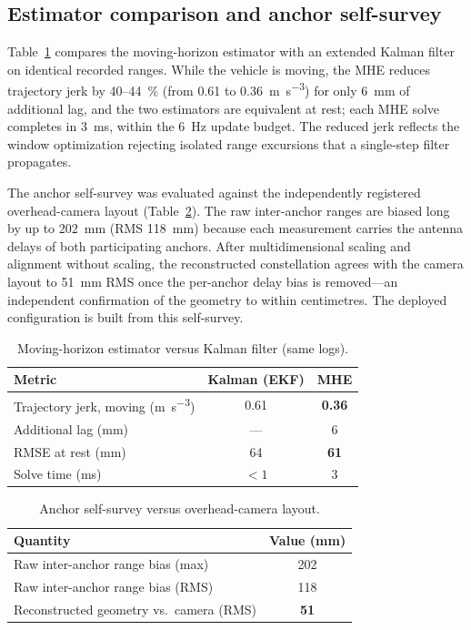 \subsection{Estimator comparison and anchor self-survey}
Table~\ref{tab:est} compares the moving-horizon estimator with an
extended Kalman filter on identical recorded ranges. While the vehicle is
moving, the MHE reduces trajectory jerk by \SI{40}{}--\SI{44}{\percent}
(from 0.61 to \SI{0.36}{\meter\per\second\cubed}) for only
\SI{6}{\milli\meter} of additional lag, and the two estimators are
equivalent at rest; each MHE solve completes in \SI{3}{\milli\second},
within the \SI{6}{\hertz} update budget. The reduced jerk reflects the
window optimization rejecting isolated range excursions that a
single-step filter propagates.

The anchor self-survey was evaluated against the independently registered
overhead-camera layout (Table~\ref{tab:survey}). The raw inter-anchor
ranges are biased long by up to \SI{202}{\milli\meter}
(RMS \SI{118}{\milli\meter}) because each measurement carries the antenna
delays of both participating anchors. After multidimensional scaling and
alignment without scaling, the reconstructed constellation agrees with
the camera layout to \SI{51}{\milli\meter} RMS once the per-anchor delay
bias is removed---an independent confirmation of the geometry to within
centimetres. The deployed configuration is built from this self-survey.

\begin{table}[t]
  \centering
  \caption{Moving-horizon estimator versus Kalman filter (same logs).}
  \label{tab:est}
  \begin{tabular}{@{}lcc@{}}
    \toprule
    \textbf{Metric} & \textbf{Kalman (EKF)} & \textbf{MHE}\\
    \midrule
    Trajectory jerk, moving (\si{\meter\per\second\cubed}) & 0.61 & \textbf{0.36}\\
    Additional lag (\si{\milli\meter})       & ---  & 6\\
    RMSE at rest (\si{\milli\meter})         & 64   & \textbf{61}\\
    Solve time (\si{\milli\second})          & $<1$ & 3\\
    \bottomrule
  \end{tabular}
\end{table}

\begin{table}[t]
  \centering
  \caption{Anchor self-survey versus overhead-camera layout.}
  \label{tab:survey}
  \begin{tabular}{@{}lc@{}}
    \toprule
    \textbf{Quantity} & \textbf{Value (\si{\milli\meter})}\\
    \midrule
    Raw inter-anchor range bias (max)          & 202\\
    Raw inter-anchor range bias (RMS)          & 118\\
    Reconstructed geometry vs.\ camera (RMS)   & \textbf{51}\\
    \bottomrule
  \end{tabular}
\end{table}

